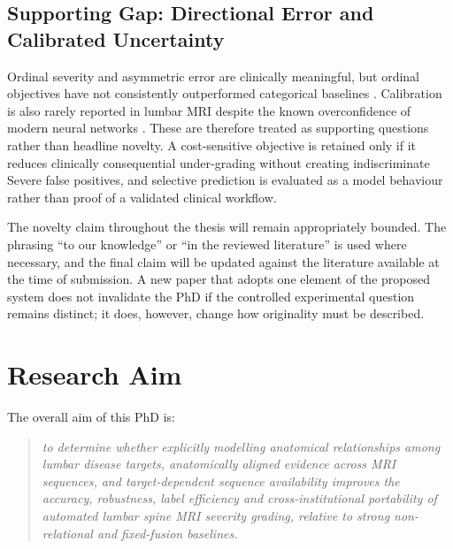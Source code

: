 \subsection{Supporting Gap: Directional Error and Calibrated Uncertainty}
\label{sec:intro-gap-error}

Ordinal severity and asymmetric error are clinically meaningful, but ordinal
objectives have not consistently outperformed categorical baselines
\cite{niemeyer2021a}. Calibration is also rarely reported in lumbar MRI despite the
known overconfidence of modern neural networks \cite{guo2017calibration}. These are
therefore treated as supporting questions rather than headline novelty. A
cost-sensitive objective is retained only if it reduces clinically consequential
under-grading without creating indiscriminate Severe false positives, and selective
prediction is evaluated as a model behaviour rather than proof of a validated
clinical workflow.

The novelty claim throughout the thesis will remain appropriately bounded. The
phrasing ``to our knowledge'' or ``in the reviewed literature'' is used where
necessary, and the final claim will be updated against the literature available at
the time of submission. A new paper that adopts one element of the proposed system
does not invalidate the PhD if the controlled experimental question remains
distinct; it does, however, change how originality must be described.


\section{Research Aim}
\label{sec:intro-aim}

The overall aim of this PhD is:

\begin{quote}
\emph{to determine whether explicitly modelling anatomical relationships among
lumbar disease targets, anatomically aligned evidence across MRI sequences, and
target-dependent sequence availability improves the accuracy, robustness, label
efficiency and cross-institutional portability of automated lumbar spine MRI
severity grading, relative to strong non-relational and fixed-fusion baselines.}
\end{quote}

